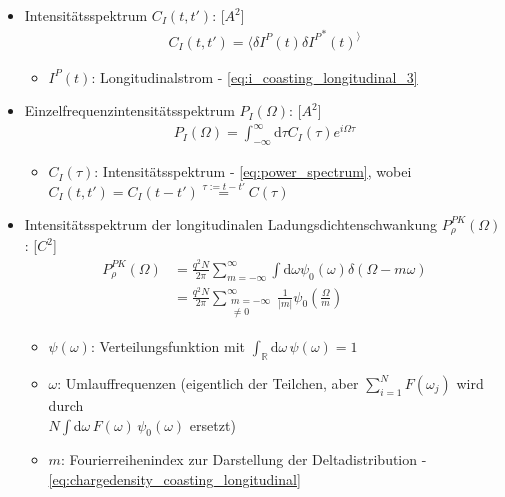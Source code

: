 \documentclass[12pt]{article}%
\begin{document}
\begin{itemize}
\item Intensitätsspektrum $C_I(t, t')$: [$A^2$]
\begin{align}  \label{eq:power_spectrum}
C_I(t, t') = \langle \delta I^P(t) \delta {I^P}^*(t)^ \rangle
\end{align}

	\begin{itemize}
		\item $I^P(t)$: Longitudinalstrom - \eqref{eq:i_coasting_longitudinal_3}
	\end{itemize}

\item Einzelfrequenzintensitätsspektrum $P_I(\Omega)$: [$A^2$]
\begin{align}
P_I(\Omega) = \int_{-\infty}^{\infty} \mathrm{d}\tau C_I(\tau) e^{i\Omega \tau}
\end{align}

	\begin{itemize}
		\item $C_I(\tau)$: Intensitätsspektrum - \eqref{eq:power_spectrum}, wobei $C_I(t, t') = C_I(t - t') \overset{\tau := t - t'}{=} C(\tau)$
	\end{itemize}

\item Intensitätsspektrum der longitudinalen Ladungsdichtenschwankung $P_\rho^{PK}(\Omega)$: [$C^2$]
\begin{subequations}
\begin{align}
	P_\rho^{PK}(\Omega) &= \frac{q^2N}{2\pi}\sum_{m=-\infty}^{\infty} \int \mathrm{d} \omega \psi_0(\omega) \delta(\Omega - m \omega) \\
	&= \frac{q^2N}{2\pi}\sum_{\substack{m=-\infty \\ \neq 0}}^{\infty} \frac{1}{|m|} \psi_0\left( \frac{\Omega}{m} \right)
\end{align}
\end{subequations}

	\begin{itemize}
	\item $\psi(\omega)$: Verteilungsfunktion mit $\int_{\mathbb{R}} \mathrm{d} \omega \, \psi(\omega) = 1$
	\item $\omega$: Umlauffrequenzen (eigentlich der Teilchen, aber $\sum_{i=1}^{N} F(\omega_j)$ wird durch \\ $N \int \mathrm{d}\omega \, F(\omega) \, \psi_0(\omega)$ ersetzt)
	\item $m$: Fourierreihenindex zur Darstellung der Deltadistribution  - \eqref{eq:chargedensity_coasting_longitudinal}


\end{itemize}
\end{itemize}
\end{document}
